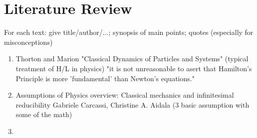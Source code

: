 \documentclass{article}
\begin{document}
\section{Literature Review}
For each text: give title/author/...; synopsis of main points; quotes (especially for misconceptions)

\begin{enumerate}
\item Thorton and Marion "Classical Dynamics of Particles and Systems"
(typical treatment of H/L in physics)
"it is not unreasonable to asert that Hamilton's Principle is more 'fundamental' than Newton's equations."
\item Assumptions of Physics overview:
Classical mechanics and infinitesimal reducibility
Gabriele Carcassi, Christine A. Aidala (3 basic assumption with some of the math)
\item 
\end{enumerate}
\end{document}
